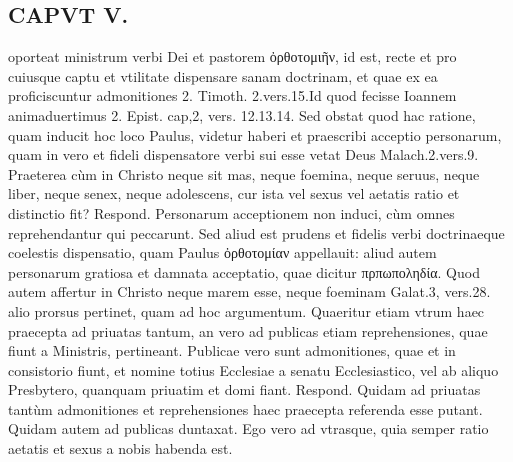 \documentclass{article}
\begin{document}
\begin{pages}
\section*{CAPVT  V. }
\marginpar{[ p.249 ]}\pstart oporteat ministrum verbi Dei et pastorem ὀρθοτομιῆν, id est, recte et pro cuiusque captu et vtilitate dispensare sanam doctrinam, et quae ex ea proficiscuntur admonitiones 2. Timoth. 2.vers.15.Id quod fecisse Ioannem animaduertimus 2. Epist. cap,2, vers. 12.13.14. Sed obstat quod hac ratione, quam inducit hoc loco Paulus, videtur haberi et praescribi acceptio personarum, quam in vero et fideli dispensatore verbi sui esse vetat Deus Malach.2.vers.9. Praeterea cùm in Christo neque sit mas, neque foemina, neque seruus, neque liber, neque senex, neque adolescens, cur ista vel sexus vel aetatis ratio et distinctio fit? Respond. Personarum acceptionem non induci, cùm omnes reprehendantur qui peccarunt. Sed aliud est prudens et fidelis verbi doctrinaeque coelestis dispensatio, quam Paulus ὀρθοτομίαν appellauit: aliud autem personarum gratiosa et damnata acceptatio, quae dicitur πρπωποληδία. Quod autem affertur in Christo neque marem esse, neque foeminam Galat.3, vers.28. alio prorsus pertinet, quam ad hoc argumentum.  \pend\pstart Quaeritur etiam vtrum haec praecepta ad priuatas tantum, an vero ad publicas etiam reprehensiones, quae fiunt a Ministris, pertineant. Publicae vero sunt admonitiones, quae et in consistorio fiunt, et nomine totius Ecclesiae a senatu Ecclesiastico, vel ab aliquo Presbytero, quanquam priuatim et domi fiant. Respond. Quidam ad priuatas tantùm admonitiones et reprehensiones haec praecepta referenda esse putant. Quidam autem ad publicas duntaxat. Ego vero ad vtrasque, quia semper ratio aetatis et sexus a nobis habenda est.  \pend

\end{pages}
\end{document}

